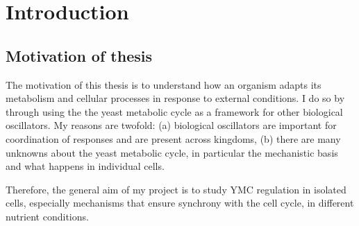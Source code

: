 
\chapter{Introduction}

\section{Motivation of thesis}

The motivation of this thesis is to understand how an organism adapts its metabolism and cellular processes in response to external conditions.
I do so by through using the the yeast metabolic cycle as a framework for other biological oscillators.
My reasons are twofold: (a) biological oscillators are important for coordination of responses and are present across kingdoms, (b) there are many unknowns about the yeast metabolic cycle, in particular the mechanistic basis and what happens in individual cells.

Therefore, the general aim of my project is to study YMC regulation in isolated cells, especially mechanisms that ensure synchrony with the cell cycle, in different nutrient conditions.


